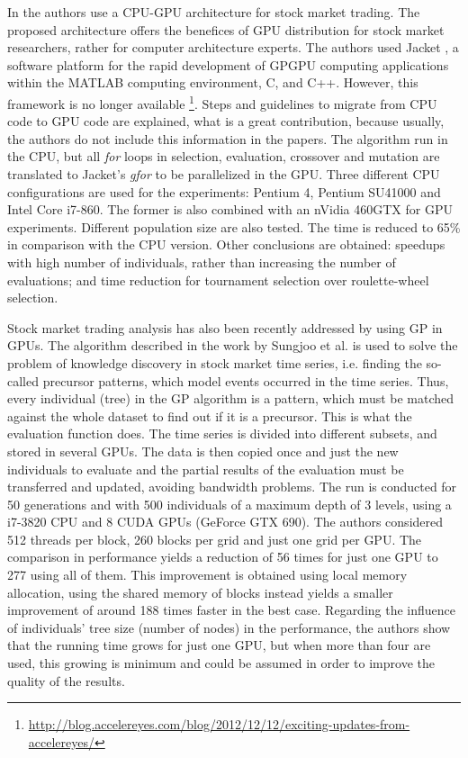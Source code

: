 \documentclass{article}
\begin{document}
In \cite{Contreras:2012:UGA:2150467.2150469} the authors use a CPU-GPU architecture for stock market trading. The proposed architecture offers the benefices of GPU distribution for stock market researchers, rather for computer architecture experts. The authors used Jacket \cite{jacket:Matlab}, a software platform for the rapid development of GPGPU computing applications within the MATLAB computing environment, C, and C++. However, this framework is no longer available \footnote{\url{http://blog.accelereyes.com/blog/2012/12/12/exciting-updates-from-accelereyes/}}. Steps and guidelines to migrate from CPU code to GPU code are explained, what is a great contribution, because usually, the authors do not include this information in the papers. The algorithm run in the CPU, but all  {\em for} loops in selection, evaluation, crossover and mutation are translated to Jacket's {\em gfor} to be parallelized in the GPU. Three different CPU configurations are used for the experiments: Pentium 4, Pentium SU41000 and Intel Core i7-860. The former is also combined with an nVidia 460GTX for GPU experiments. Different population size are also tested. The time is reduced to 65\% in comparison with the CPU version. Other conclusions are obtained: speedups with high number of individuals, rather than increasing the number of evaluations; and time reduction for  tournament selection  over roulette-wheel selection.

Stock market trading analysis has also been recently addressed by
using GP in GPUs. The algorithm described in the work by Sungjoo et
al. \cite{Sungjoo15fastknowledge} is used to solve the problem of
knowledge discovery in stock market time series, i.e. finding the
so-called precursor patterns, which model events occurred in the time
series. Thus, every individual (tree) in the GP algorithm is a
pattern, which must be matched against the whole dataset to find
out if it is a precursor. This is what the evaluation function
does. The time series is divided into different subsets, and stored in
several GPUs. The data is then copied once and just the new
individuals to evaluate and the partial results of the evaluation must
be transferred and updated, avoiding bandwidth problems.
The run is conducted for 50 generations and with 500 individuals of a maximum depth of 3 levels, using a i7-3820 CPU and 8 CUDA GPUs (GeForce GTX 690). 
The authors considered
512 threads per block, 260 blocks per grid and just one grid per
GPU. The comparison in performance yields a reduction of 56 times for
just one GPU to 277 using all of them. This improvement is obtained using
local memory allocation, using the shared memory of blocks instead
yields a smaller improvement of around 188 times faster in the best
case. Regarding the influence of individuals' tree size (number of
nodes) in the performance, the authors show that the running time
grows for just one GPU, but when more than four are used, this growing
is minimum and could be assumed in order to improve the quality of the
results. %
\end{document}
